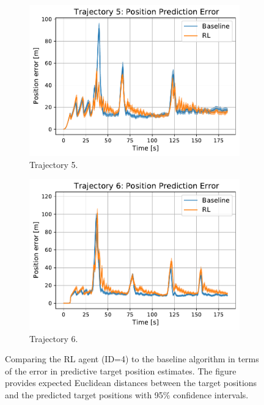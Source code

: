 \documentclass[english, 12pt, a4paper, elec, utf8, a-1b, online]{aaltothesis}
\numberwithin{equation}{section}
\begin{document}
\begin{figure}
    \begin{subfigure}[b]{0.45\textwidth}
        \centering
        \includegraphics[width=\linewidth]{figures/benchmark/Simulations/mean_position_error4.pdf}
        \caption{Trajectory 5.}
        \label{fig:PE_T5}
    \end{subfigure}
    \hfill
    \begin{subfigure}[b]{0.45\textwidth}
        \centering
        \includegraphics[width=\linewidth]{figures/benchmark/Simulations/mean_position_error5.pdf}
        \caption{Trajectory 6.}
        \label{fig:PE_T6}
    \end{subfigure}
    \caption{Comparing the RL agent (ID=4) to the baseline algorithm in terms of the error in predictive target position estimates. The figure provides expected Euclidean distances between the target positions and the predicted target positions with 95\% confidence intervals.}
    \label{fig:position_error_comparison}
\end{figure}
\end{document}
